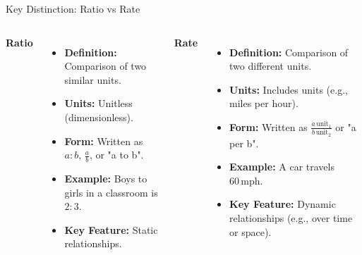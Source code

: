 \documentclass{beamer}
\begin{document}
\begin{frame}{Key Distinction: Ratio vs Rate}
    \begin{columns}[T] %
        \centering
        \textbf{Ratio}
        \begin{itemize}
            \item \textbf{Definition:} Comparison of two similar units.
            \item \textbf{Units:} Unitless (dimensionless).
            \item \textbf{Form:} Written as \( a:b \), \( \frac{a}{b} \), or "a to b".
            \item \textbf{Example:} Boys to girls in a classroom is \( 2:3 \).
            \item \textbf{Key Feature:} Static relationships.
        \end{itemize}

        \centering
        \textbf{Rate}
        \begin{itemize}
            \item \textbf{Definition:} Comparison of two different units.
            \item \textbf{Units:} Includes units (e.g., miles per hour).
            \item \textbf{Form:} Written as \( \frac{a \, \text{unit}_1}{b \, \text{unit}_2} \) or "a per b".
            \item \textbf{Example:} A car travels \( 60 \, \text{mph} \).
            \item \textbf{Key Feature:} Dynamic relationships (e.g., over time or space).
        \end{itemize}
    \end{columns}
\end{frame}
\end{document}
